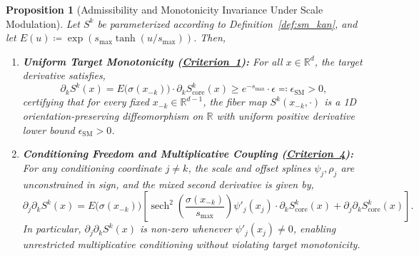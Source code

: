 \documentclass[11pt,a4paper]{article}
\theoremstyle{plain}
\newtheorem{proposition}[theorem]{Proposition}
\theoremstyle{definition}
\theoremstyle{remark}
\begin{document}
\begin{proposition}[Admissibility and Monotonicity Invariance Under Scale Modulation]
\label{prop:scale_modulated_mono}
Let $S^k$ be parameterized according to Definition~\ref{def:sm_kan}, and let $E(u) \coloneqq \exp(s_{\max}\tanh(u / s_{\max}))$. Then,
\begin{enumerate}
    \item \textbf{Uniform Target Monotonicity (\hyperref[crit:target_monotonicity]{Criterion~1}):} For all $x \in \mathbb{R}^d$, the target derivative satisfies,
    \begin{equation}
        \partial_k S^k(x) = E\big(\sigma(x_{-k})\big) \cdot \partial_k S^k_{\text{core}}(x) \ge e^{-s_{\max}} \cdot \epsilon \eqqcolon \epsilon_{\text{SM}} > 0,
        \label{eq:sm_derivative}
    \end{equation}
    certifying that for every fixed $x_{-k} \in \mathbb{R}^{d-1}$, the fiber map $S^k(x_{-k}, \cdot)$ is a 1D orientation-preserving diffeomorphism on $\mathbb{R}$ with uniform positive derivative lower bound $\epsilon_{\text{SM}} > 0$.
    \item \textbf{Conditioning Freedom and Multiplicative Coupling (\hyperref[crit:conditioning_freedom]{Criterion~4}):} For any conditioning coordinate $j \neq k$, the scale and offset splines $\psi_j, \rho_j$ are unconstrained in sign, and the mixed second derivative is given by,
    \begin{equation}
        \partial_j \partial_k S^k(x) = E\big(\sigma(x_{-k})\big) \left[ \operatorname{sech}^2\left(\frac{\sigma(x_{-k})}{s_{\max}}\right) \psi'_j(x_j) \cdot \partial_k S^k_{\text{core}}(x) + \partial_j \partial_k S^k_{\text{core}}(x) \right].
        \label{eq:sm_mixed_deriv}
    \end{equation}
    In particular, $\partial_j \partial_k S^k(x)$ is non-zero whenever $\psi'_j(x_j) \neq 0$, enabling unrestricted multiplicative conditioning without violating target monotonicity.
\end{enumerate}
\end{proposition}
\end{document}
